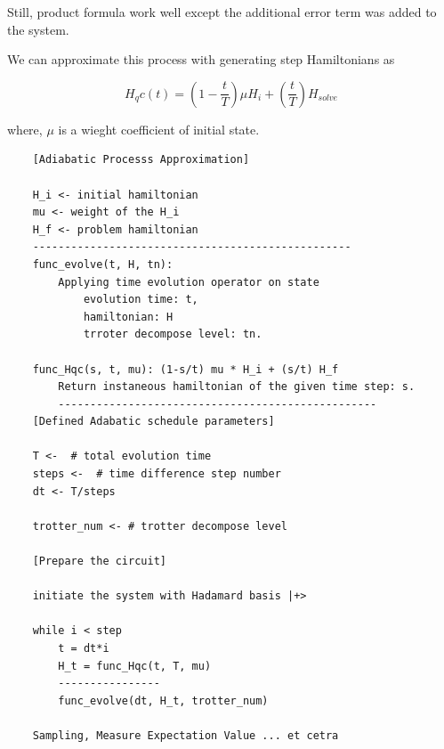 Still, product formula work well except the additional error 
term was added to the system.

We can approximate this process with generating step Hamiltonians as 

\begin{equation}
    H_qc(t) = \left( 1- \frac{t}{T}\right) \mu H_i + \left( \frac{t}{T}\right) H_{solve}
\end{equation}

where, $\mu$ is a wieght coefficient of initial state.


\begin{lstlisting}
    [Adiabatic Processs Approximation]

    H_i <- initial hamiltonian
    mu <- weight of the H_i
    H_f <- problem hamiltonian
    --------------------------------------------------
    func_evolve(t, H, tn): 
        Applying time evolution operator on state
            evolution time: t, 
            hamiltonian: H 
            trroter decompose level: tn.
    
    func_Hqc(s, t, mu): (1-s/t) mu * H_i + (s/t) H_f
        Return instaneous hamiltonian of the given time step: s.
        --------------------------------------------------
    [Defined Adabatic schedule parameters]
    
    T <-  # total evolution time
    steps <-  # time difference step number
    dt <- T/steps
    
    trotter_num <- # trotter decompose level
    
    [Prepare the circuit]
    
    initiate the system with Hadamard basis |+>
    
    while i < step
        t = dt*i
        H_t = func_Hqc(t, T, mu)
        ----------------
        func_evolve(dt, H_t, trotter_num)
    
    Sampling, Measure Expectation Value ... et cetra
\end{lstlisting}


